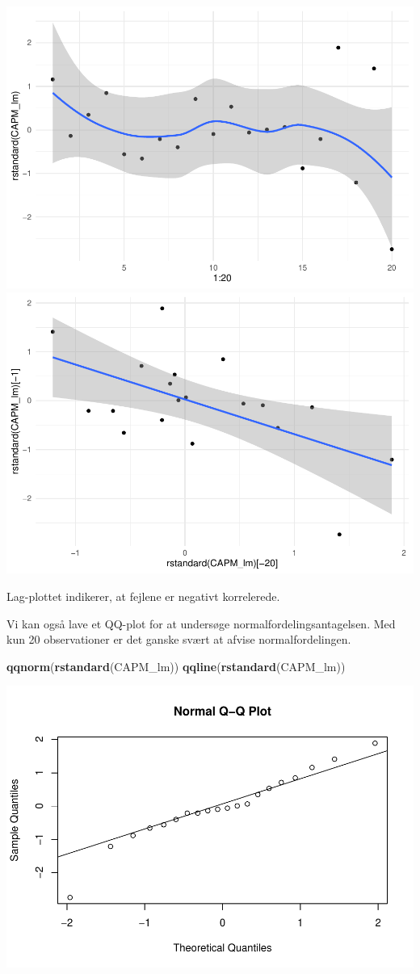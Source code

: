 \documentclass[
]{article}
\newenvironment{Shaded}{\begin{snugshade}}{\end{snugshade}}
\newcommand{\KeywordTok}[1]{\textcolor[rgb]{0.13,0.29,0.53}{\textbf{#1}}}
\newcommand{\NormalTok}[1]{#1}
\begin{document}
\includegraphics[width=0.5\linewidth]{matstatproblems20-21_files/figure-latex/unnamed-chunk-98-1}
\includegraphics[width=0.5\linewidth]{matstatproblems20-21_files/figure-latex/unnamed-chunk-98-2}

Lag-plottet indikerer, at fejlene er negativt korrelerede.

Vi kan også lave et QQ-plot for at undersøge normalfordelingsantagelsen.
Med kun 20 observationer er det ganske svært at afvise
normalfordelingen.

\begin{Shaded}
\begin{Highlighting}[]
\KeywordTok{qqnorm}\NormalTok{(}\KeywordTok{rstandard}\NormalTok{(CAPM_lm))}
\KeywordTok{qqline}\NormalTok{(}\KeywordTok{rstandard}\NormalTok{(CAPM_lm))}
\end{Highlighting}
\end{Shaded}

\includegraphics{matstatproblems20-21_files/figure-latex/unnamed-chunk-99-1.pdf}
\end{document}
